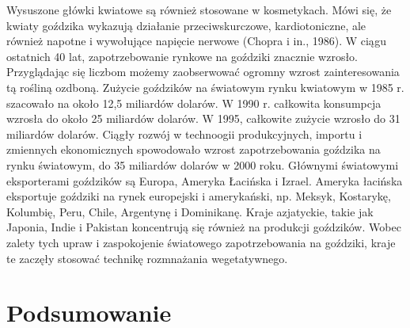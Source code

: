 \documentclass[two column, twoside, a4paper]{article}
\begin{document}
Wysuszone główki kwiatowe są również stosowane w kosmetykach. Mówi się, że kwiaty goździka wykazują działanie przeciwskurczowe, kardiotoniczne, ale również napotne i wywołujące napięcie nerwowe (Chopra i in., 1986).
W ciągu ostatnich 40 lat, zapotrzebowanie rynkowe na goździki znacznie wzrosło. Przyglądając się liczbom możemy zaobserwować ogromny wzrost zainteresowania tą rośliną ozdboną. Zużycie goździków na światowym rynku kwiatowym w 1985 r. szacowało na  około 12,5 miliardów dolarów. W 1990 r. całkowita konsumpcja wzrosła do około 25 miliardów dolarów. W 1995, całkowite zużycie wzrosło do 31 miliardów dolarów. Ciągły rozwój w technoogii produkcyjnych, importu i zmiennych ekonomicznych spowodowało wzrost zapotrzebowania goździka na rynku światowym, do 35 miliardów dolarów w 2000 roku.
Głównymi światowymi eksporterami goździków są Europa, Ameryka Łacińska i Izrael.
Ameryka łacińska eksportuje goździki na rynek europejski i amerykański, np. Meksyk, Kostarykę, Kolumbię, Peru, Chile, Argentynę i Dominikanę. Kraje azjatyckie, takie jak Japonia, Indie i Pakistan koncentrują się również na produkcji goździków. Wobec
zalety tych upraw i zaspokojenie światowego zapotrzebowania na goździki, kraje te zaczęły stosować technikę rozmnażania wegetatywnego.

\section{Podsumowanie}

\nocite{Malepszy2004, Mulcahy1975, Jain1997, Gutierrez2010, Fraga2004, Forkmann1980, Casas2009, Ahmadian2017}
\printbibliography
\end{document}

